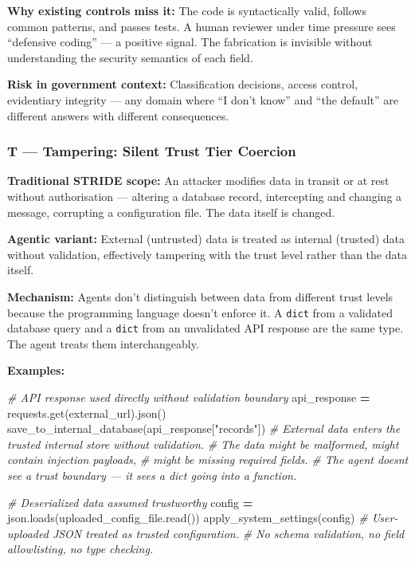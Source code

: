 \documentclass[a4paper,11pt]{report}
\newenvironment{Shaded}{\begin{snugshade}}{\end{snugshade}}
\newcommand{\CommentTok}[1]{\textcolor[rgb]{0.56,0.35,0.01}{\textit{#1}}}
\newcommand{\NormalTok}[1]{#1}
\newcommand{\OperatorTok}[1]{\textcolor[rgb]{0.81,0.36,0.00}{\textbf{#1}}}
\newcommand{\StringTok}[1]{\textcolor[rgb]{0.31,0.60,0.02}{#1}}
\begin{document}
\textbf{Why existing controls miss it:} The code is syntactically valid,
follows common patterns, and passes tests. A human reviewer under time
pressure sees ``defensive coding'' --- a positive signal. The
fabrication is invisible without understanding the security semantics of
each field.

\textbf{Risk in government context:} Classification decisions, access
control, evidentiary integrity --- any domain where ``I don't know'' and
``the default'' are different answers with different consequences.

\hypertarget{t-tampering-silent-trust-tier-coercion}{%
\subsubsection{T --- Tampering: Silent Trust Tier
Coercion}\label{t-tampering-silent-trust-tier-coercion}}

\textbf{Traditional STRIDE scope:} An attacker modifies data in transit
or at rest without authorisation --- altering a database record,
intercepting and changing a message, corrupting a configuration file.
The data itself is changed.

\textbf{Agentic variant:} External (untrusted) data is treated as
internal (trusted) data without validation, effectively tampering with
the trust level rather than the data itself.

\textbf{Mechanism:} Agents don't distinguish between data from different
trust levels because the programming language doesn't enforce it. A
\texttt{dict} from a validated database query and a \texttt{dict} from
an unvalidated API response are the same type. The agent treats them
interchangeably.

\textbf{Examples:}

\begin{Shaded}
\begin{Highlighting}[]
\CommentTok{\# API response used directly without validation boundary}
\NormalTok{api\_response }\OperatorTok{=}\NormalTok{ requests.get(external\_url).json()}
\NormalTok{save\_to\_internal\_database(api\_response[}\StringTok{"records"}\NormalTok{])}
\CommentTok{\# External data enters the trusted internal store without validation.}
\CommentTok{\# The data might be malformed, might contain injection payloads,}
\CommentTok{\# might be missing required fields.}
\CommentTok{\# The agent doesn\textquotesingle{}t see a trust boundary — it sees a dict going into a function.}

\CommentTok{\# Deserialized data assumed trustworthy}
\NormalTok{config }\OperatorTok{=}\NormalTok{ json.loads(uploaded\_config\_file.read())}
\NormalTok{apply\_system\_settings(config)}
\CommentTok{\# User{-}uploaded JSON treated as trusted configuration.}
\CommentTok{\# No schema validation, no field allowlisting, no type checking.}
\end{Highlighting}
\end{Shaded}
\end{document}
